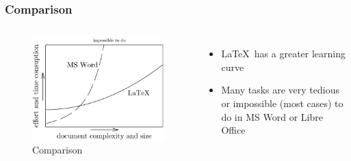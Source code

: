 \documentclass[10pt]{beamer}\usepackage[]{graphicx}\usepackage[]{color}
\begin{document}
\begin{frame}\frametitle{Comparison}
\begin{columns}[c] %

\begin{figure}[h!]
\centering
\includegraphics[scale=1, keepaspectratio]{./miktex}
\caption{Comparison}
\label{fig:word}
\end{figure}

\begin{itemize}
\item \LaTeX \, has a greater learning curve
\item Many tasks are very tedious or impossible (most cases) to do in MS Word or Libre Office
\end{itemize}
\end{columns}

\end{frame}

\end{document}

